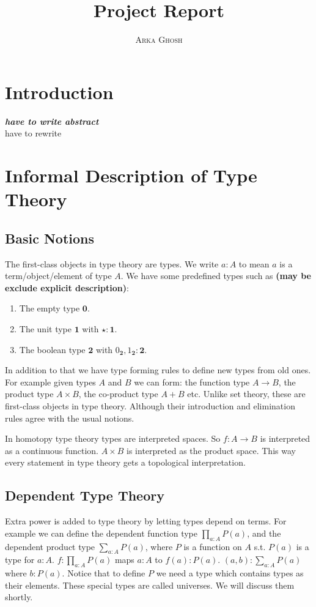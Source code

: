 \documentclass[10pt]{article}
\title{\bf{Project Report}}
\author{\textsc{Arka Ghosh}}
\theoremstyle{definition}
\theoremstyle{plain}
\theoremstyle{remark}
\begin{document}
\begin{titlepage}

\maketitle

\tableofcontents
\end{titlepage}

\section{Introduction}\label{Intro}
\textbf{\textit{have to write abstract}}\\
have to rewrite 

\section{Informal Description of Type Theory}

\subsection{Basic Notions}

The first-class objects in type theory are types.  We write $a : A$ to mean $a$ is a 
term/object/element of type $A$. We have some predefined types such as \textbf{(may be exclude
explicit description)}:
\begin{enumerate}
\item The empty type $\mathbf{0}$.
\item The unit type $\mathbf{1}$ with $\star : \mathbf{1}$.
\item The boolean type $\mathbf{2}$ with $0_{\mathbf{2}}, 1_{\mathbf{2}} : \mathbf{2}$.  
\end{enumerate}
In addition to that we have type forming rules to define new types from old ones. For example
given types $A$ and $B$ we can form: the function type $A \to B$, the product type 
$A \times B$, the co-product type $A + B$ etc. Unlike set theory, these are first-class 
objects in type theory. Although their introduction and elimination rules agree with the 
usual notions.\smallskip

In homotopy type theory types are interpreted spaces. So $f : A \to B$ is 
interpreted as a continuous function. $A \times B$ is interpreted as the product space.
This way every statement in type theory gets a topological interpretation.

\subsection{Dependent Type Theory}
Extra power is added to type theory by letting types depend on terms. For example we can 
define the dependent function type $\prod_{a : A} P(a)$, and the dependent product type
$\sum_{a : A} P(a)$, where $P$ is a function on $A$ s.t. $P(a)$ is a type for $a : A$. 
$f : \prod_{a : A} P(a)$ maps $a : A$ to $f(a) : P(a)$. $(a,b) : \sum_{a : A} P(a)$ where
$b : P(a)$. Notice that to define $P$ we need a type which contains types as their elements.
These special types are called universes. We will discuss them shortly. 
 
\end{document}
